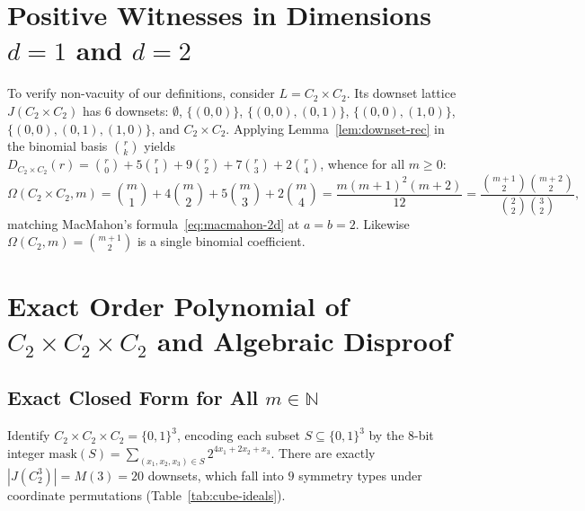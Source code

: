 \documentclass[11pt,a4paper]{article}
\theoremstyle{definition}
\begin{document}
\section{Positive Witnesses in Dimensions \texorpdfstring{$d = 1$ and $d = 2$}{d = 1 and d = 2}}

To verify non-vacuity of our definitions, consider $L = C_2 \times C_2$. Its downset lattice
$J(C_2 \times C_2)$ has $6$ downsets: $\emptyset$, $\{(0,0)\}$, $\{(0,0),(0,1)\}$,
$\{(0,0),(1,0)\}$, $\{(0,0),(0,1),(1,0)\}$, and $C_2 \times C_2$. Applying
Lemma~\ref{lem:downset-rec} in the binomial basis $\binom{r}{k}$ yields $D_{C_2 \times C_2}(r) =
\binom{r}{0} + 5\binom{r}{1} + 9\binom{r}{2} + 7\binom{r}{3} + 2\binom{r}{4}$, whence for all
$m \ge 0$:
\[
  \Omega(C_2 \times C_2, m)
  = \binom{m}{1} + 4\binom{m}{2} + 5\binom{m}{3} + 2\binom{m}{4}
  = \frac{m(m+1)^2(m+2)}{12}
  = \frac{\binom{m+1}{2}\binom{m+2}{2}}{\binom{2}{2}\binom{3}{2}},
\]
matching MacMahon's formula~\eqref{eq:macmahon-2d} at $a = b = 2$. Likewise $\Omega(C_2, m) =
\binom{m+1}{2}$ is a single binomial coefficient.

\section{Exact Order Polynomial of \texorpdfstring{$C_2 \times C_2 \times C_2$}{C2 x C2 x C2} and Algebraic Disproof}

\subsection{Exact Closed Form for All \texorpdfstring{$m \in \mathbb{N}$}{m in N}}

Identify $C_2 \times C_2 \times C_2 = \{0,1\}^3$, encoding each subset $S \subseteq \{0,1\}^3$ by
the $8$-bit integer $\mathrm{mask}(S) = \sum_{(x_1,x_2,x_3) \in S} 2^{4x_1 + 2x_2 + x_3}$. There are
exactly $|J(C_2^3)| = M(3) = 20$ downsets, which fall into $9$ symmetry types under coordinate
permutations (Table~\ref{tab:cube-ideals}).
\end{document}
